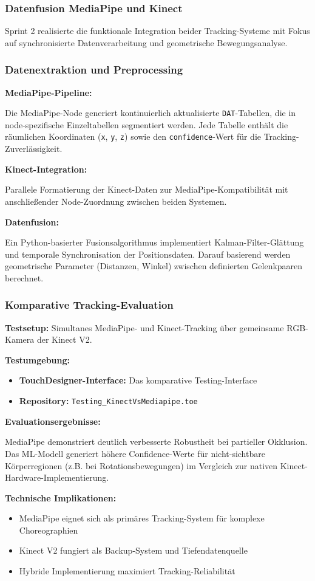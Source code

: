 \subsubsection{Datenfusion MediaPipe und Kinect}

Sprint 2 realisierte die funktionale Integration beider Tracking-Systeme mit Fokus auf synchronisierte Datenverarbeitung und geometrische Bewegungsanalyse.

\subsubsection{Datenextraktion und Preprocessing}

\textbf{MediaPipe-Pipeline:}
\raggedright Die MediaPipe-Node generiert kontinuierlich aktualisierte \texttt{DAT}-Tabellen, die in node-spezifische Einzeltabellen segmentiert werden. Jede Tabelle enthält die räumlichen Koordinaten (\texttt{x}, \texttt{y}, \texttt{z}) sowie den \texttt{confidence}-Wert für die Tracking-Zuverlässigkeit.

\textbf{Kinect-Integration:}
\raggedright Parallele Formatierung der Kinect-Daten zur MediaPipe-Kompatibilität mit anschließender Node-Zuordnung zwischen beiden Systemen.

\textbf{Datenfusion:}
\raggedright Ein Python-basierter Fusionsalgorithmus implementiert Kalman-Filter-Glättung und temporale Synchronisation der Positionsdaten. Darauf basierend werden geometrische Parameter (Distanzen, Winkel) zwischen definierten Gelenkpaaren berechnet.



\subsubsection{Komparative Tracking-Evaluation}

\textbf{Testsetup:}
Simultanes MediaPipe- und Kinect-Tracking über gemeinsame RGB-Kamera der Kinect V2.

\textbf{Testumgebung:}
\begin{itemize}
    \item \textbf{TouchDesigner-Interface:} Das komparative Testing-Interface
    \item \textbf{Repository:} \texttt{Testing\_KinectVsMediapipe.toe}
\end{itemize}


\textbf{Evaluationsergebnisse:}
\raggedright MediaPipe demonstriert deutlich verbesserte Robustheit bei partieller Okklusion. Das ML-Modell generiert höhere Confidence-Werte für nicht-sichtbare Körperregionen (z.B. bei Rotationsbewegungen) im Vergleich zur nativen Kinect-Hardware-Implementierung.

\textbf{Technische Implikationen:}
\begin{itemize}
    \item MediaPipe eignet sich als primäres Tracking-System für komplexe Choreographien
    \item Kinect V2 fungiert als Backup-System und Tiefendatenquelle
    \item Hybride Implementierung maximiert Tracking-Reliabilität
\end{itemize}